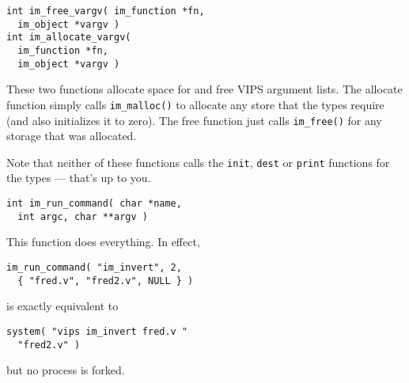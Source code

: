 \begin{verbatim}
int im_free_vargv( im_function *fn, 
  im_object *vargv )
int im_allocate_vargv( 
  im_function *fn, 
  im_object *vargv )
\end{verbatim}

These two functions allocate space for and free VIPS argument lists. The
allocate function simply calls \verb+im_malloc()+ to allocate any store
that the types require (and also initializes it to zero). The free function
just calls \verb+im_free()+ for any storage that was allocated.

Note that neither of these functions calls the \verb+init+, \verb+dest+
or \verb+print+ functions for the types --- that's up to you.

\begin{verbatim}
int im_run_command( char *name, 
  int argc, char **argv )
\end{verbatim}

This function does everything. In effect,

\begin{verbatim}
im_run_command( "im_invert", 2, 
  { "fred.v", "fred2.v", NULL } )
\end{verbatim}

is exactly equivalent to

\begin{verbatim}
system( "vips im_invert fred.v "
  "fred2.v" )
\end{verbatim}

but no process is forked.
